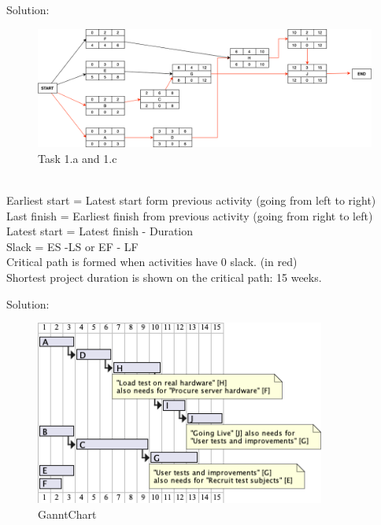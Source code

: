 \begin{parlist}
	\item Solution: 
	\begin{figure}[hbt]
	\centering
  \includegraphics[width=1.4\textwidth]{Immagini/ND.png}
	  \caption{Task 1.a and 1.c}
\end{figure}
\\
Earliest start = Latest start form previous activity (going from left to right)\\
Last finish = Earliest finish from previous activity (going from right to left)\\
Latest start = Latest finish - Duration\\
Slack = ES -LS or EF - LF\\
Critical path is formed when activities have 0 slack. (in red)\\
Shortest project duration is shown on the critical path: 15 weeks.\cite{CriticalPath}

	\item Solution:
\begin{figure}[hbt]
	\centering
  \includegraphics[width=0.85\textwidth]{Immagini/ganntChart.png}
  \caption{GanntChart}
\end{figure}
\end{parlist}